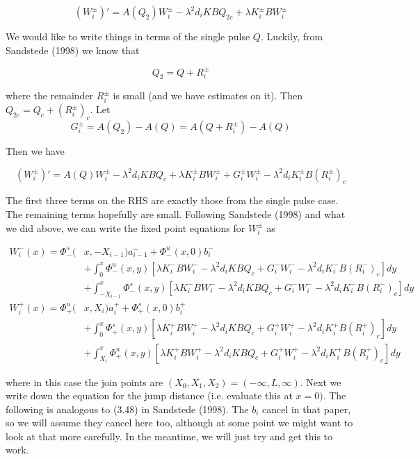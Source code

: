 \documentclass[12pt]{article}
\begin{document}
\[
(W_i^\pm)' = A(Q_2)W_i^\pm - \lambda^2 d_i KBQ_{2c} + \lambda K_i^\pm BW_i^\pm
\]

We would like to write things in terms of the single pulse $Q$. Luckily, from Sandstede (1998) we know that

\[
Q_2 = Q + R_i^\pm
\]

where the remainder $R_i^\pm$ is small (and we have estimates on it). Then $Q_{2c} = Q_c + (R_i^\pm)_c$. Let
\[
G_i^\pm = A(Q_2) - A(Q) = A(Q + R_i^\pm) - A(Q)
\]

Then we have

\begin{equation}\label{inteigQ}
(W_i^\pm)' = A(Q)W_i^\pm - \lambda^2 d_i KBQ_{c} + \lambda K_i^\pm BW_i^\pm + G_i^\pm W_i^\pm - \lambda^2 d_i K_i^\pm B (R_i^\pm)_c
\end{equation}  

The first three terms on the RHS are exactly those from the single pulse case. The remaining terms hopefully are small. Following Sandstede (1998) and what we did above, we can write the fixed point equations for $W_i^\pm$ as

\begin{align*}
W_i^-(x) = \Phi^s_-(&x, -X_{i-1})a_{i-1}^- + \Phi^u_-(x, 0)b_i^- \\
&+ \int_0^x \Phi^u_-(x, y)[\lambda K_i^- BW_i^- - \lambda^2 d_i KBQ_{c} + G_i^- W_i^- - \lambda^2 d_i K_i^- B (R_i^-)_c ] dy \\
&+ \int_{-X_{i-1}}^x \Phi^s_-(x, y)[\lambda K_i^- BW_i^- - \lambda^2 d_i KBQ_{c} + G_i^- W_i^- - \lambda^2 d_i K_i^- B (R_i^-)_c ] dy \\
W_i^+(x) = \Phi^u_+(&x, X_i)a_i^+ + \Phi^s_+(x, 0)b_i^+ \\
&+ \int_0^x \Phi^s_+(x, y)[\lambda K_i^+ BW_i^+ - \lambda^2 d_i KBQ_{c} + G_i^+ W_i^+ - \lambda^2 d_i K_i^+ B (R_i^+)_c ] dy \\
&+ \int_{X_i}^x \Phi^u_+(x, y)[\lambda K_i^+ BW_i^+ - \lambda^2 d_i KBQ_{c} + G_i^+ W_i^+ - \lambda^2 d_i K_i^+ B (R_i^+)_c ]dy
\end{align*}

where in this case the join points are $(X_0, X_1, X_2) = (-\infty, L, \infty)$. Next we write down the equation for the jump distance (i.e. evaluate this at $x = 0)$. The following is analogous to (3.48) in Sandstede (1998). The $b_i$ cancel in that paper, so we will assume they cancel here too, although at some point we might want to look at that more carefully. In the meantime, we will just try and get this to work.
\end{document}
